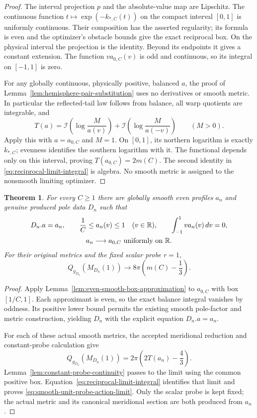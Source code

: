 \documentclass[11pt]{article}
\newtheorem{theorem}{Theorem}[section]
\newcommand{\I}{\mathcal I}
\newcommand{\R}{\mathbb R}
\begin{document}
\begin{proof}
The interval projection $p$ and the absolute-value map are Lipschitz.
The continuous function $t\mapsto\exp(-k_{*,C}(t))$ on the compact
interval $[0,1]$ is uniformly continuous. Their composition has the asserted
regularity; its formula is even and the optimizer's obstacle bounds give
the exact reciprocal box. On the physical interval the projection is the
identity. Beyond its endpoints it gives a constant extension.
The function $v a_{0,C}(v)$ is odd and continuous, so its integral on
$[-1,1]$ is zero.

For any globally continuous, physically positive, balanced $a$, the proof of
Lemma~\ref{lem:hemisphere-pair-substitution} uses no derivatives or smooth metric.
In particular the reflected-tail law follows from balance, all warp quotients
are integrable, and
\[
 T(a)=\I\!\left(\log\frac{M}{a(v)}\right)
      +\I\!\left(\log\frac{M}{a(-v)}\right)\qquad(M>0).
\]
Apply this with $a=a_{0,C}$ and $M=1$. On $[0,1]$, its northern logarithm
is exactly $k_{*,C}$; evenness identifies the southern logarithm with it.
The functional depends only on this interval, proving $T(a_{0,C})=2m(C)$.
The second identity in \eqref{eq:reciprocal-limit-integral} is algebra.
No smooth metric is assigned to the nonsmooth limiting optimizer.
\end{proof}

\begin{theorem}\label{thm:smooth-unit-probe-recovery}
For every $C\geq1$ there are globally smooth even profiles $a_n$ and
genuine produced pole data $D_n$ such that
\[
 \begin{gathered}
 D_n.a=a_n,\qquad
 \frac1C\leq a_n(v)\leq1\quad(v\in\R),\qquad
 \int_{-1}^1v a_n(v)\,dv=0,\\
 a_n\longrightarrow a_{0,C}\ \hbox{uniformly on }\R .
 \end{gathered}
\]
For their original metrics and the fixed scalar probe $r=1$,
\begin{equation}\label{eq:smooth-unit-probe-action-limit}
 Q_{g_{D_n}}(M_{D_n}(1))
       \longrightarrow8\pi\left(m(C)-\frac13\right).
\end{equation}
\end{theorem}

\begin{proof}
Apply Lemma~\ref{lem:even-smooth-box-approximation} to
$a_{0,C}$ with box $[1/C,1]$. Each approximant is even, so the exact
balance integral vanishes by oddness. Its positive lower bound permits the
existing smooth pole-factor and metric construction, yielding $D_n$ with
the explicit equation $D_n.a=a_n$.

For each of these actual smooth metrics, the accepted meridional reduction
and constant-probe calculation give
\[
 Q_{g_{D_n}}(M_{D_n}(1))
       =2\pi\left(2T(a_n)-\frac43\right).
\]
Lemma~\ref{lem:constant-probe-continuity} passes to the limit using the
common positive box. Equation~\eqref{eq:reciprocal-limit-integral} identifies
that limit and proves \eqref{eq:smooth-unit-probe-action-limit}.
Only the scalar probe is kept fixed; the actual metric and its canonical
meridional section are both produced from $a_n$.
\end{proof}
\end{document}
